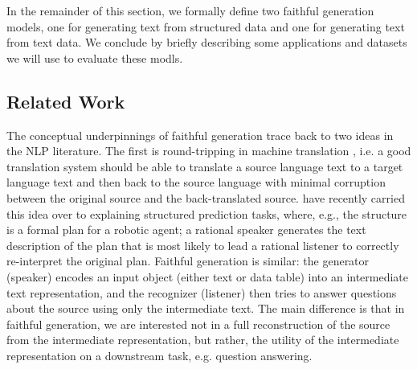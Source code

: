 In the remainder of this section, we formally define two faithful generation
models, one for generating text from structured data and 
one for generating text from  text data. We conclude by briefly describing some
applications and datasets we will use to evaluate these modls.

\subsection{Related Work}


The conceptual underpinnings of faithful generation trace back to two
ideas in the NLP literature. The first is round-tripping in machine translation
\citep{somers2005round,rapp2009back}, i.e. a good translation system should be able to translate
a source language text to a target language text and then back to the source
language with minimal corruption between the original source and the 
back-translated source. \cite{andreas2016reasoning} have recently carried 
this idea 
over to explaining structured prediction tasks, where, e.g., 
the structure is a 
formal plan for a robotic agent; a rational speaker  generates the text
description of the plan that is most likely to lead a rational listener 
to correctly re-interpret the original plan. Faithful generation is similar:
the generator (speaker) 
 encodes an 
input object
(either text or data table) into 
an intermediate text representation, and the recognizer (listener) then tries to 
answer questions about the source using only the intermediate text.
The main difference is that in faithful generation, we are interested not in
a full reconstruction of the source from the intermediate representation, but
rather, the utility of the intermediate representation on a downstream task, 
e.g. question answering.


